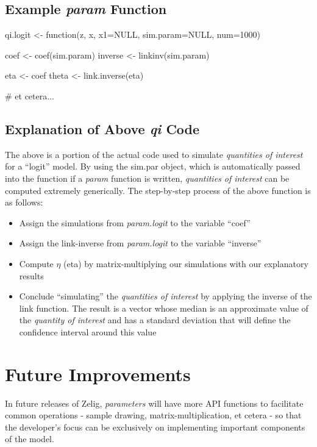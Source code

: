 \subsection{Example \emph{param} Function}

\begin{Code}
qi.logit <- function(z, x, x1=NULL, sim.param=NULL, num=1000) {
  coef <- coef(sim.param)
  inverse <- linkinv(sim.param)

  eta <- coef %
  theta <- link.inverse(eta)

  # et cetera...
}

\end{Code}


\subsection{Explanation of Above \emph{qi} Code}

The above is a portion of the actual code used to simulate \emph{quantities of interest} for a ``logit'' model.  By using the sim.par object, which is automatically passed into the function if a \emph{param} function is written, \emph{quantities of interest} can be computed extremely generically.  The step-by-step process of the above function is as follows:

\begin{itemize}
	\item{Assign the simulations from \emph{param.logit} to the variable ``coef''}
	\item{Assign the link-inverse from \emph{param.logit} to the variable ``inverse''}
	\item{Compute $\eta$ (eta) by matrix-multiplying our simulations with our explanatory results}
	\item{Conclude ``simulating'' the \emph{quantities of interest} by applying the inverse of the link function.  The result is a vector whose median is an approximate value of the \emph{quantity of interest} and has a standard deviation that will define the confidence interval around this value}
	
\end{itemize}


\section{Future Improvements}

In future releases of Zelig, \emph{parameters} will have more API functions to facilitate common operations - sample drawing, matrix-multiplication, et cetera - so that the developer's focus can be exclusively on implementing important components of the model.
